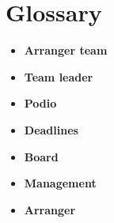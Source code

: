 \section{Glossary}
\begin{itemize}
	\item \textbf{Arranger team}
	\item \textbf{Team leader}\\
	\item \textbf{Podio}\\
	\item \textbf{Deadlines}\\
	\item \textbf{Board}\\
	\item \textbf{Management}\\
	\item \textbf{Arranger}\\
\end{itemize}